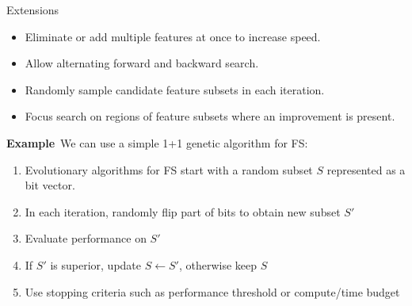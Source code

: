 \documentclass[11pt,compress,t,notes=noshow, xcolor=table]{beamer}
\begin{document}
  \begin{vbframe}{Extensions}
    \vspace{-0.1cm}
    \begin{itemize}
      \setlength{\itemsep}{0.8em}
      \item Eliminate or add multiple features at once to increase speed.
      \item Allow alternating forward and backward search.
      \item Randomly sample candidate feature subsets in each iteration.
      \item Focus search on regions of feature subsets where an improvement is present.
    \end{itemize}
\vspace{0.1cm}
\textbf{Example}\, We can use a simple 1+1 genetic algorithm for FS:
\begin{enumerate}
    \item Evolutionary algorithms for FS start with a random subset $S$ represented as a bit vector.
    \item In each iteration, randomly flip part of bits to obtain new subset $S'$
    \item Evaluate performance on $S'$
    \item If $S'$ is superior, update $S\leftarrow S'$, otherwise keep $S$
    \item Use stopping criteria such as performance threshold or compute/time budget
\end{enumerate}

\end{vbframe}

\end{document}
